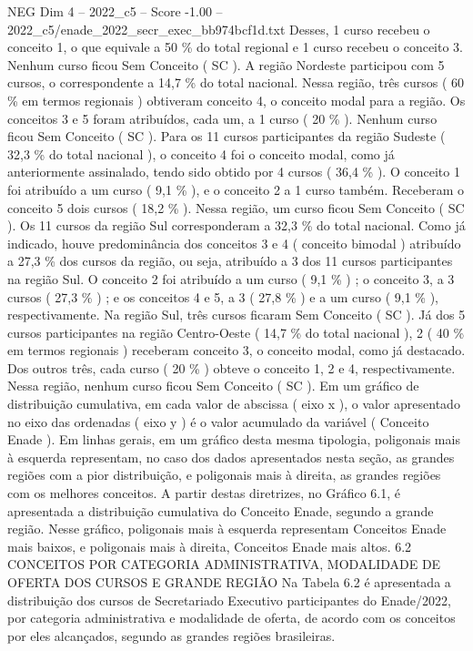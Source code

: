 \begin{textsample}{NEG Dim 4 – 2022\_c5 – Score -1.00 – 2022\_c5/enade\_2022\_secr\_exec\_bb974bcf1d.txt}
Desses, 1 curso recebeu o conceito 1, o que equivale a 50 \% do total regional e 1 curso recebeu o conceito 3.
Nenhum curso ficou Sem Conceito ( SC ).
A região Nordeste participou com 5 cursos, o correspondente a 14,7 \% do total nacional.
Nessa região, três cursos ( 60 \% em termos regionais ) obtiveram conceito 4, o conceito modal para a região.
Os conceitos 3 e 5 foram atribuídos, cada um, a 1 curso ( 20 \% ).
Nenhum curso ficou Sem Conceito ( SC ).
Para os 11 cursos participantes da região Sudeste ( 32,3 \% do total nacional ), o conceito 4 foi o conceito modal, como já anteriormente assinalado, tendo sido obtido por 4 cursos ( 36,4 \% ).
O conceito 1 foi atribuído a um curso ( 9,1 \% ), e o conceito 2 a 1 curso também.
Receberam o conceito 5 dois cursos ( 18,2 \% ).
Nessa região, um curso ficou Sem Conceito ( SC ).
Os 11 cursos da região Sul corresponderam a 32,3 \% do total nacional.
Como já indicado, houve predominância dos conceitos 3 e 4 ( conceito bimodal ) atribuído a 27,3 \% dos cursos da região, ou seja, atribuído a 3 dos 11 cursos participantes na região Sul.
O conceito 2 foi atribuído a um curso ( 9,1 \% ) ; o conceito 3, a 3 cursos ( 27,3 \% ) ; e os conceitos 4 e 5, a 3 ( 27,8 \% ) e a um curso ( 9,1 \% ), respectivamente.
Na região Sul, três cursos ficaram Sem Conceito ( SC ).
Já dos 5 cursos participantes na região Centro-Oeste ( 14,7 \% do total nacional ), 2 ( 40 \% em termos regionais ) receberam conceito 3, o conceito modal, como já destacado.
Dos outros três, cada curso ( 20 \% ) obteve o conceito 1, 2 e 4, respectivamente.
Nessa região, nenhum curso ficou Sem Conceito ( SC ).
Em um gráfico de distribuição cumulativa, em cada valor de abscissa ( eixo x ), o valor apresentado no eixo das ordenadas ( eixo y ) é o valor acumulado da variável ( Conceito Enade ).
Em linhas gerais, em um gráfico desta mesma tipologia, poligonais mais à esquerda representam, no caso dos dados apresentados nesta seção, as grandes regiões com a pior distribuição, e poligonais mais à direita, as grandes regiões com os melhores conceitos.
A partir destas diretrizes, no Gráfico 6.1, é apresentada a distribuição cumulativa do Conceito Enade, segundo a grande região.
Nesse gráfico, poligonais mais à esquerda representam Conceitos Enade mais baixos, e poligonais mais à direita, Conceitos Enade mais altos. 6.2 CONCEITOS POR CATEGORIA ADMINISTRATIVA, MODALIDADE DE OFERTA DOS CURSOS E GRANDE REGIÃO Na Tabela 6.2 é apresentada a distribuição dos cursos de Secretariado Executivo participantes do Enade/2022, por categoria administrativa e modalidade de oferta, de acordo com os conceitos por eles alcançados, segundo as grandes regiões brasileiras.

\end{textsample}
